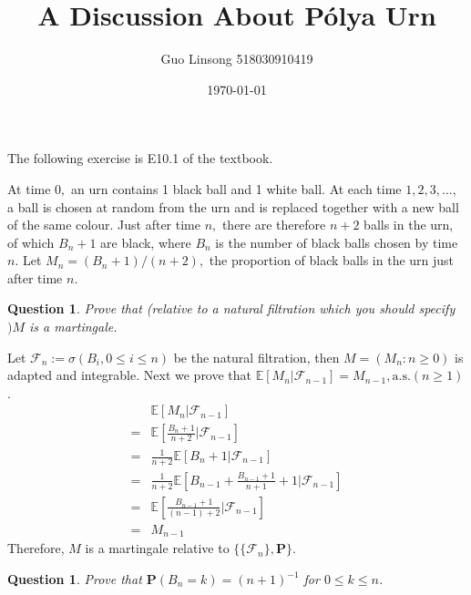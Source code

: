 \documentclass{article}
\title{A Discussion About Pólya Urn}
\author{Guo Linsong 518030910419}
\date{\today}
\newtheorem{question}[theorem]{Question}
\begin{document}
\maketitle


    The following exercise is E10.1 of the textbook.

      At time $0,$ an urn contains 1 black ball and 1 white ball. At each time $1,2,3, \ldots,$ a ball is chosen at random from the urn and is replaced together with a new ball of the same colour. Just after time $n,$ there are therefore $n+2$ balls in the urn, of which $B_{n}+1$ are black, where $B_{n}$ is the number of black balls chosen by time $n$.  Let $M_{n}=\left(B_{n}+1\right) /(n+2),$ the proportion of black balls in the urn just after time $n .$

\begin{question}
Prove that (relative to a natural filtration which you should specify $) M$ is a martingale.
\end{question}

\begin{solution}
Let $\mathcal{F}_{n}:=\sigma(B_i,0\le i \le n)$ be the natural filtration, then $M=(M_n:n\ge 0)$ is adapted and integrable. Next we prove that $\mathbb{E}[M_n|\mathcal{F}_{n-1}]=M_{n-1},\text{a.s.}(n\ge 1)$.
\begin{equation*}
    \begin{array}{rl}
        & \mathbb{E}\left[M_n|\mathcal{F}_{n-1}\right] \\
     =  & \mathbb{E}\left[\frac{B_n+1}{n+2}\big|\mathcal{F}_{n-1}\right] \\
     =  & \frac{1}{n+2}\mathbb{E}\left[B_{n}+1\big|\mathcal{F}_{n-1}\right] \\
     =  & \frac{1}{n+2}\mathbb{E}\left[B_{n-1}+\frac{B_{n-1}+1}{n+1}+1\big|\mathcal{F}_{n-1}\right] \\
     =  & \mathbb{E}\left[\frac{B_{n-1}+1}{(n-1)+2}\big|\mathcal{F}_{n-1}\right] \\
     = & M_{n-1}
    \end{array}
\end{equation*}
Therefore, $M$ is a martingale relative to $\{\{\mathcal{F}_n\},\mathbf{P}\}$.
\end{solution}


\begin{question}
Prove that $\mathbf{P}\left(B_{n}=k\right)=(n+1)^{-1}$  for $0 \leq k \leq n$.
\end{question}
\end{document}
